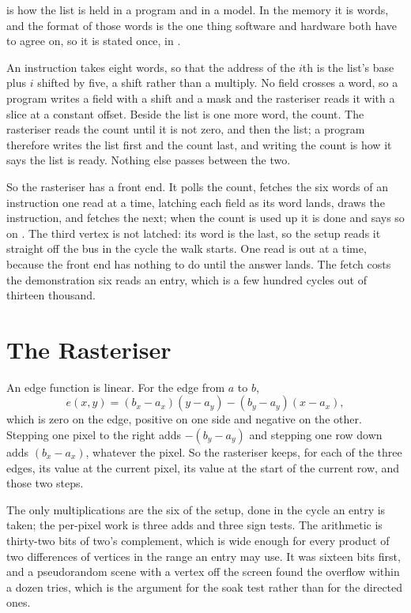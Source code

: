 \documentclass[journal,9pt]{IEEEtran}
\newcommand{\gpupart}[4]{%
}
\begin{document}
 is how the list is held in a program and in a model.
In the memory it is words, and the format of those words is the one
thing software and hardware both have to agree on, so it is stated
once, in .

\gpupart{dl.rs}{format}{The display list as a program writes it:
eight words an instruction, six of which say anything, and no field
across a word.}{lst:g-format}

An instruction takes eight words, so that the address of the
$i$th is the list's base plus $i$ shifted by five, a shift rather
than a multiply. No field crosses a word, so a program writes a field
with a shift and a mask and the rasteriser reads it with a slice at a
constant offset. Beside the list is one more word, the count. The
rasteriser reads the count until it is not zero, and then the list;
a program therefore writes the list first and the count last, and
writing the count is how it says the list is ready. Nothing else
passes between the two.

So the rasteriser has a front end. It polls the count, fetches the
six words of an instruction one read at a time, latching each field
as its word lands, draws the instruction, and fetches the next; when
the count is used up it is done and says so on . The
third vertex is not latched: its word is the last, so the setup reads
it straight off the bus in the cycle the walk starts. One read is out
at a time, because the front end has nothing to do until the answer
lands. The fetch costs the demonstration six reads an entry,
which is a few hundred cycles out of thirteen thousand.

\section{The Rasteriser}
\label{sec:g-raster}

An edge function is linear. For the edge from $a$ to $b$,
\[ e(x, y) = (b_x - a_x)(y - a_y) - (b_y - a_y)(x - a_x), \]
which is zero on the edge, positive on one side and negative on the
other. Stepping one pixel to the right adds $-(b_y - a_y)$ and
stepping one row down adds $(b_x - a_x)$, whatever the pixel. So the
rasteriser keeps, for each of the three edges, its value at the
current pixel, its value at the start of the current row, and those
two steps.

\gpupart{raster.rs}{state}{The rasteriser's state.}{lst:g-state}

The only multiplications are the six of the setup, done in the cycle
an entry is taken; the per-pixel work is three adds and three sign
tests. The arithmetic is thirty-two bits of two's complement, which
is wide enough for every product of two differences of vertices in
the range an entry may use. It was sixteen bits first, and a
pseudorandom scene with a vertex off the screen found the overflow
within a dozen tries, which is the argument for the soak test rather
than for the directed ones.
\end{document}
